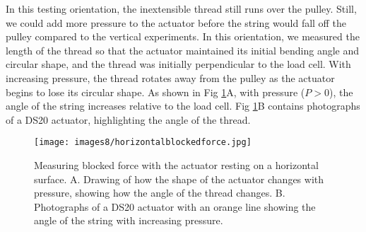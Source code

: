 In this testing orientation, the inextensible thread still runs over the pulley. Still, we could add more pressure to the actuator before the string would fall off the pulley compared to the vertical experiments. In this orientation, we measured the length of the thread so that the actuator maintained its initial bending angle and circular shape, and the thread was initially perpendicular to the load cell. With increasing pressure, the thread rotates away from the pulley as the actuator begins to lose its circular shape. As shown in Fig \ref{fig:horizontalblockedforce}A, with pressure ($P > 0$), the angle of the string increases relative to the load cell. Fig \ref{fig:horizontalblockedforce}B contains photographs of a DS20 actuator, highlighting the angle of the thread. 

\begin{figure}[ht]
    \centering
     \texttt{[image: images8/horizontalblockedforce.jpg]}
    \caption{Measuring blocked force with the actuator resting on a horizontal surface. A. Drawing of how the shape of the actuator changes with pressure, showing how the angle of the thread changes. B. Photographs of a DS20 actuator with an orange line showing the angle of the string with increasing pressure.}
    \label{fig:horizontalblockedforce}
\end{figure}